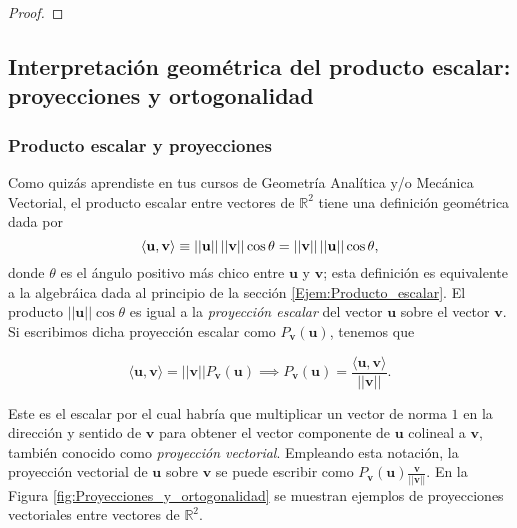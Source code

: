 \documentclass[12pt,dvipsnames]{article}
\newenvironment{teorema}[2][Teorema]{\begin{trivlist}
\item[\hskip \labelsep {\bfseries #1}\hskip \labelsep {\bfseries #2.}]}{\end{trivlist}}
\begin{document}
\begin{teorema} {2.2.3.1}
\begin{proof}
\end{proof}
\end{teorema}

\newpage
\subsection{Interpretación geométrica del producto escalar: proyecciones y ortogonalidad}\label{Subsec:Interpretación geométrica del producto escalar} 

\subsubsection{Producto escalar y proyecciones} \label{Subsec:Producto_escalar_y_proyecciones}

Como quizás aprendiste en tus cursos de Geometría Analítica y/o Mecánica Vectorial, el producto escalar entre vectores de $\mathbb{R}^2$ tiene una definición geométrica dada por $$\langle\mathbf{u},\mathbf{v}\rangle\equiv ||\mathbf{u}||\hspace{0.5mm}||\mathbf{v}||\cos{\theta}=||\mathbf{v}||\hspace{0.5mm} ||\mathbf{u}||\cos{\theta},$$ \noindent donde $\theta$ es el ángulo positivo más chico entre $\mathbf{u}$ y $\mathbf{v}$; esta definición es equivalente a la algebráica dada al principio de la sección \ref{Ejem:Producto_escalar}. El producto $||\mathbf{u}||\cos{\theta}$ es igual a la \emph{proyección escalar} del vector $\mathbf{u}$ sobre el vector $\mathbf{v}$. Si escribimos dicha proyección escalar como $P_{\mathbf{v}}(\mathbf{u})$, tenemos que

$$\langle\mathbf{u},\mathbf{v}\rangle=||\mathbf{v}||P_{\mathbf{v}}(\mathbf{u}) \implies P_{\mathbf{v}}(\mathbf{u})=\frac{\langle\mathbf{u},\mathbf{v}\rangle}{||\mathbf{v}||}.$$ 

\noindent Este es el escalar por el cual habría que multiplicar un vector de norma $1$ en la dirección y sentido de $\mathbf{v}$ para obtener el vector componente de $\mathbf{u}$ colineal a $\mathbf{v}$, también conocido como \emph{proyección vectorial}. Empleando esta notación, la proyección vectorial de $\mathbf{u}$ sobre $\mathbf{v}$ se puede escribir como $P_{\mathbf{v}}(\mathbf{u})\frac{\mathbf{v}}{||\mathbf{v}||} .$ En la Figura \ref{fig:Proyecciones_y_ortogonalidad} se muestran ejemplos de proyecciones vectoriales entre vectores de $\mathbb{R}^2$.
\end{document}
